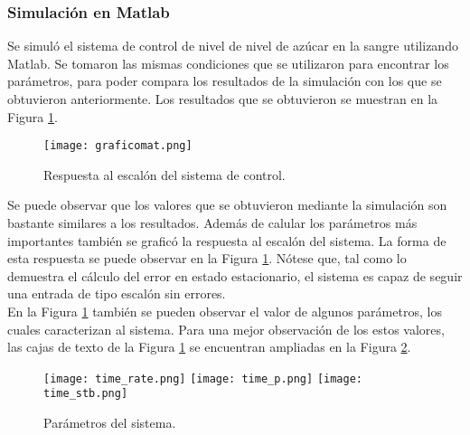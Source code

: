 \documentclass[journal]{IEEEtran}
\begin{document}
\subsubsection*{Simulaci\'on en Matlab}

Se simul\'o el sistema de control de nivel de nivel de 
az\'ucar en la sangre utilizando Matlab. Se tomaron las 
mismas condiciones 
que se utilizaron para encontrar los par\'ametros, para 
poder compara los resultados de la simulaci\'on con los que
se obtuvieron anteriormente. Los resultados que se obtuvieron
se muestran en la Figura 
\ref{Step_response}. \\


\begin{figure}[h]
\texttt{[image: graficomat.png]}
\caption{Respuesta al escal\'on del sistema de control.}
\label{Step_response}
\end{figure}

Se puede observar que los valores que se obtuvieron mediante
la simulaci\'on son bastante similares a los resultados. 
Adem\'as de calular los par\'ametros m\'as importantes 
tambi\'en se grafic\'o la respuesta al escal\'on del sistema. 
La forma de esta respuesta se puede observar en la Figura
\ref{Step_response}. N\'otese que, tal como lo demuestra el 
c\'alculo del error en estado estacionario, el sistema es 
capaz de seguir una entrada de tipo escal\'on sin errores. \\

En la Figura \ref{Step_response} tambi\'en se pueden 
observar el valor de algunos par\'ametros, los cuales 
caracterizan al sistema. Para una mejor observaci\'on de los 
estos valores, las cajas de texto de la Figura
\ref{Step_response} se encuentran ampliadas en la Figura
\ref{Parametros_NAS}. \\

\begin{figure}[h]
\centering
\texttt{[image: time\_rate.png]}
\texttt{[image: time\_p.png]}
\texttt{[image: time\_stb.png]}
\caption{Par\'ametros del sistema.}
\label{Parametros_NAS}
\end{figure}
\end{document}
